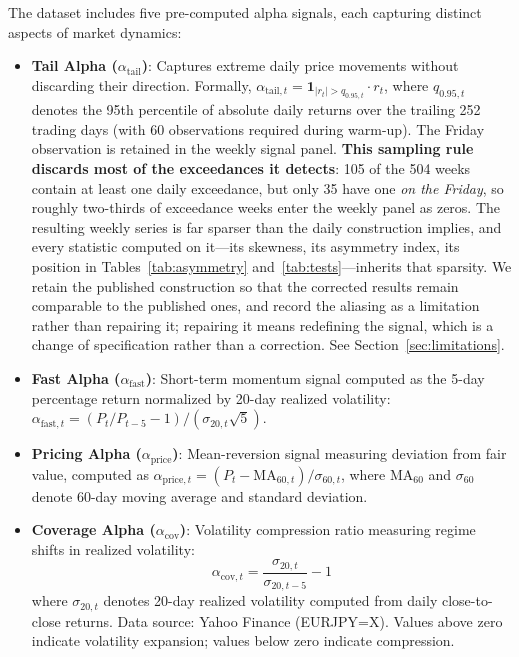 \documentclass[11pt]{article}
\begin{document}
\label{sec:signals}
The dataset includes five pre-computed alpha signals, each capturing distinct aspects of market dynamics:

\begin{itemize}
    \item \textbf{Tail Alpha ($\alpha_{\text{tail}}$)}: Captures extreme daily price movements without discarding their direction. Formally, $\alpha_{\text{tail},t} = \mathbf{1}_{|r_t| > q_{0.95,t}} \cdot r_t$, where $q_{0.95,t}$ denotes the 95th percentile of absolute daily returns over the trailing 252 trading days (with 60 observations required during warm-up). The Friday observation is retained in the weekly signal panel. \textbf{This sampling rule discards most of the exceedances it detects}: 105 of the 504 weeks contain at least one daily exceedance, but only 35 have one \emph{on the Friday}, so roughly two-thirds of exceedance weeks enter the weekly panel as zeros. The resulting weekly series is far sparser than the daily construction implies, and every statistic computed on it---its skewness, its asymmetry index, its position in Tables~\ref{tab:asymmetry} and~\ref{tab:tests}---inherits that sparsity. We retain the published construction so that the corrected results remain comparable to the published ones, and record the aliasing as a limitation rather than repairing it; repairing it means redefining the signal, which is a change of specification rather than a correction. See Section~\ref{sec:limitations}.

    \item \textbf{Fast Alpha ($\alpha_{\text{fast}}$)}: Short-term momentum signal computed as the 5-day percentage return normalized by 20-day realized volatility: $\alpha_{\text{fast},t} = (P_t/P_{t-5} - 1) / (\sigma_{20,t} \sqrt{5})$.

    \item \textbf{Pricing Alpha ($\alpha_{\text{price}}$)}: Mean-reversion signal measuring deviation from fair value, computed as $\alpha_{\text{price},t} = (P_t - \text{MA}_{60,t}) / \sigma_{60,t}$, where $\text{MA}_{60}$ and $\sigma_{60}$ denote 60-day moving average and standard deviation.

    \item \textbf{Coverage Alpha ($\alpha_{\text{cov}}$)}: Volatility compression ratio measuring regime shifts in realized volatility:
    \begin{equation}
        \alpha_{\text{cov},t} = \frac{\sigma_{20,t}}{\sigma_{20,t-5}} - 1
    \end{equation}
    where $\sigma_{20,t}$ denotes 20-day realized volatility computed from daily close-to-close returns. Data source: Yahoo Finance (EURJPY=X). Values above zero indicate volatility expansion; values below zero indicate compression.


\end{itemize}
\end{document}
